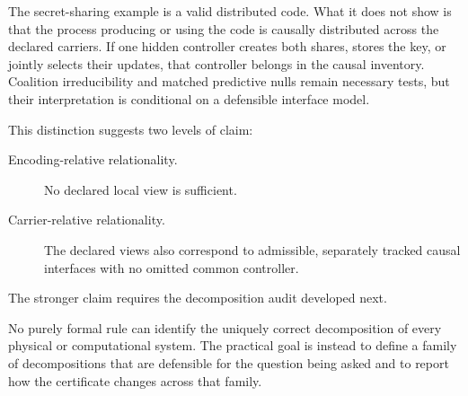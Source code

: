 The secret-sharing example is a valid distributed code. What it does not show
is that the process producing or using the code is causally distributed across
the declared carriers. If one hidden controller creates both shares, stores
the key, or jointly selects their updates, that controller belongs in the
causal inventory. Coalition irreducibility and matched predictive nulls remain
necessary tests, but their interpretation is conditional on a defensible
interface model.

This distinction suggests two levels of claim:
\begin{description}
\item[Encoding-relative relationality.] No declared local view is sufficient.
\item[Carrier-relative relationality.] The declared views also correspond to
admissible, separately tracked causal interfaces with no omitted common
controller.
\end{description}
The stronger claim requires the decomposition audit developed next.


No purely formal rule can identify the uniquely correct decomposition of every
physical or computational system. The practical goal is instead to define a
family of decompositions that are defensible for the question being asked and
to report how the certificate changes across that family.

